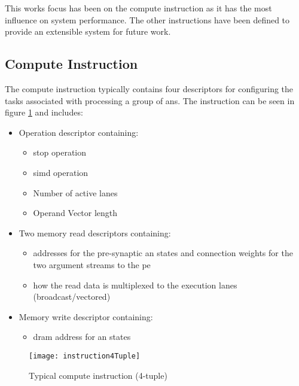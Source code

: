 This works focus has been on the compute instruction as it has the most influence on system performance.
The other instructions have been defined to provide an extensible system for future work.

\subsection{Compute Instruction}
\label{sec:Compute Instruction}

The compute instruction typically contains four descriptors for configuring the tasks associated with processing a group of \acp{an}.
The instruction can be seen in figure \ref{fig:Instruction (4-tuple example)} and includes: 
\begin{itemize}
  \item Operation descriptor containing:
    \begin{itemize}
      \item \ac{stop} operation
      \item \ac{simd} operation
      \item Number of active lanes
      \item Operand Vector length
    \end{itemize}
  \item Two memory read descriptors containing:
    \begin{itemize}
        \item addresses for the pre-synaptic \ac{an} states and connection weights for the two argument streams to the \ac{pe}
        \item how the read data is multiplexed to the execution lanes (broadcast/vectored)
    \end{itemize}
  \item Memory write descriptor containing:
    \begin{itemize}
      \item \ac{dram} address for \ac{an} states
    \end{itemize}
\end{itemize}

\begin{figure}[!t]
\centering
\captionsetup{justification=centering}
\captionsetup{width=.9\linewidth}
\centerline{
\mbox{\texttt{[image: instruction4Tuple]}}
}
\caption{Typical compute instruction (4-tuple)}
\label{fig:Instruction (4-tuple example)}
\end{figure}


